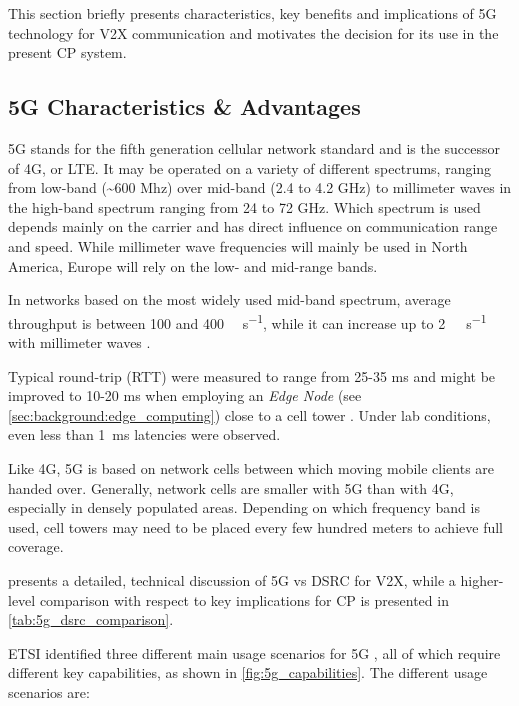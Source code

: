 This section briefly presents characteristics, key benefits and implications of 5G technology for V2X communication and motivates the decision for its use in the present CP system.

\subsection{5G Characteristics \& Advantages}
\label{subsec:concept_design:5g_characteristics_advantages}
5G stands for the fifth generation cellular network standard and is the successor of 4G, or LTE. It may be operated on a variety of different spectrums, ranging from low-band (\textasciitilde 600 Mhz) over mid-band (2.4 to 4.2 \si{\giga\hertz}) to millimeter waves in the high-band spectrum ranging from 24 to 72 \si{\giga\hertz}. Which spectrum is used depends mainly on the carrier and has direct influence on communication range and speed. While millimeter wave frequencies will mainly be used in North America, Europe will rely on the low- and mid-range bands.

In networks based on the most widely used mid-band spectrum, average throughput is between 100 and 400 \si{\mega\bit\per\second}, while it can increase up to \SI{2}{\giga\bit\per\second} with millimeter waves \cite{wiki:5g}.

Typical round-trip (RTT) were measured to range from 25-35 \si{\milli\second} and might be improved to 10-20 \si{\milli\second} when employing an \textit{Edge Node} (see \autoref{sec:background:edge_computing}) close to a cell tower \cite{wiki:5g}. Under lab conditions, even less than \SI{1}{\milli\second} latencies were observed.

Like 4G, 5G is based on network cells between which moving mobile clients are handed over. Generally, network cells are smaller with 5G than with 4G, especially in densely populated areas. Depending on which frequency band is used, cell towers may need to be placed every few hundred meters to achieve full coverage.

\cite{5GAutomotiveAssociation2016} presents a detailed, technical discussion of 5G vs DSRC for V2X, while a higher-level comparison with respect to key implications for CP is presented in \autoref{tab:5g_dsrc_comparison}.
\par
\bigskip

ETSI identified three different main usage scenarios for 5G \cite{ETSI5G}, all of which require different key capabilities, as shown in \autoref{fig:5g_capabilities}. The different usage scenarios are:


